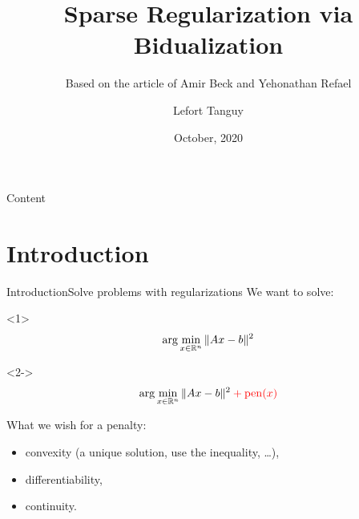 \documentclass[10pt,aspectratio=43]{beamer}
\title[Regularization via Bidualization] %
	{Sparse Regularization via Bidualization} %
\subtitle{Based on the article of Amir Beck and Yehonathan Refael}
\date{October, 2020} %
\author[]%
	{%
		{Lefort Tanguy}%
	}
\institute[
	]
	{%
	    University of Montpellier
	}
\begin{document}
	\maketitle

	\begin{frame}{Content}{}
		\tableofcontents
	\end{frame}
	

\section{Introduction}
\begin{frame}{Introduction}{Solve problems with regularizations}
We want to solve:
\begin{onlyenv}<1>
\[\arg\min_{x\in\mathbb{R}^n} \|Ax-b\|^2  \]
\end{onlyenv}

\begin{onlyenv}<2->
\[\arg\min_{x\in\mathbb{R}^n} \|Ax-b\|^2 \color{red}+ \mathrm{pen}(x)\]

What we wish for a penalty:
\begin{itemize}
    \item convexity (a unique solution, use the inequality, \dots),
    \item differentiability,
    \item continuity.
\end{itemize}
\end{onlyenv}
\end{frame}

\end{document}
